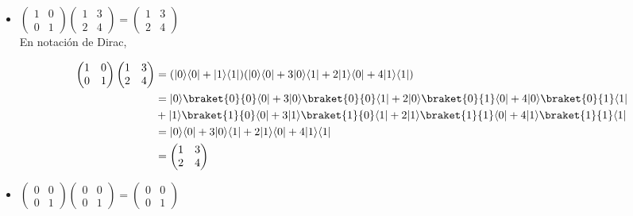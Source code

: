 \documentclass[osajnl,preprint,showpacs,superscriptaddress,10pt]{revtex4-1} %
\DeclarePairedDelimiter\bra{\langle}{\rvert}
\DeclarePairedDelimiter\ket{\lvert}{\rangle}
\begin{document}
\begin{itemize}
    \item $\begin{pmatrix}1 & 0 \\ 0 & 1\end{pmatrix}\begin{pmatrix}1 & 3\\ 2 & 4\end{pmatrix} = \begin{pmatrix}1 & 3\\ 2 & 4\end{pmatrix}$ \\
    
    En notación de Dirac,
    \begin{fleqn}[\parindent]
    \begin{equation}
    \begin{split}
        \begin{pmatrix}1 & 0 \\ 0 & 1\end{pmatrix}\begin{pmatrix}1 & 3\\ 2 & 4\end{pmatrix}
            &= (\ket{0}\bra{0} + \ket{1}\bra{1})(\ket{0}\bra{0} + 3\ket{0}\bra{1} + 2\ket{1}\bra{0} + 4\ket{1}\bra{1}) \\
            &= \ket{0}\braket{0}{0}\bra{0} + 3 \ket{0}\braket{0}{0}\bra{1} + 2\ket{0}\braket{0}{1}\bra{0} + 4 \ket{0}\braket{0}{1}\bra{1} \\
            &+ \ket{1}\braket{1}{0}\bra{0} + 3 \ket{1}\braket{1}{0}\bra{1} + 2\ket{1}\braket{1}{1}\bra{0} + 4 \ket{1}\braket{1}{1}\bra{1} \\
            &= \ket{0}\bra{0} + 3 \ket{0}\bra{1} + 2\ket{1}\bra{0} + 4 \ket{1}\bra{1} \\
            &= \begin{pmatrix}1 & 3\\ 2 & 4\end{pmatrix}
    \end{split}
    \end{equation}
    \end{fleqn}
    
    \item $\begin{pmatrix}0 & 0 \\ 0 & 1\end{pmatrix}\begin{pmatrix}0 & 0\\ 0 & 1\end{pmatrix} = \begin{pmatrix}0 & 0\\ 0 & 1\end{pmatrix}$ \\
    

\end{itemize}
\end{document}
